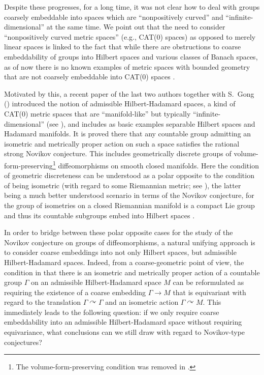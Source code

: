 \documentclass[11pt]{article}
\theoremstyle{definition}
\theoremstyle{plain}
\begin{document}
Despite these progresses, for a long time, it was not clear how to deal with groups coarsely embeddable into spaces which are ``nonpositively curved'' and ``infinite-dimensional'' at the same time.  
We point out that the need to consider ``nonpositively curved metric spaces'' (e.g., CAT(0) spaces) as opposed to merely linear spaces is linked to the fact that while there are obstructions to coarse embeddability of groups into Hilbert spaces and various classes of Banach spaces, as of now there is no known examples of metric spaces with bounded geometry that are not coarsely embeddable into CAT(0) spaces \cite[Question~9]{EskenazisNaor2019}. 


















Motivated by this, 
a recent paper of the last two authors together with S.~Gong (\cite{GWY2018}) introduced the notion of admissible Hilbert-Hadamard spaces, a kind of CAT(0) metric spaces that are ``manifold-like'' but typically ``infinite-dimensional'' (see ), and includes as basic examples separable Hilbert spaces and Hadamard manifolds. It is proved there that any countable group admitting an isometric and metrically proper action on such a space satisfies the rational strong Novikov conjecture. 
This includes geometrically discrete groups of volume-form-preserving\footnote{The volume-form-preserving condition was removed in \cite{GWXY2023}.} diffeomorphisms on smooth closed manifolds. Here the condition of geometric discreteness can be understood as a polar opposite to the condition of being isometric (with regard to some Riemannian metric; see \cite[the discussion below Theorem~1.3]{GWY2018}), the latter being a much better understood scenario in terms of the Novikov conjecture, for the group of isometries on a closed Riemannian manifold is a compact Lie group and thus its countable subgroups embed into Hilbert spaces \cite{GHW05}. 

In order to bridge between these polar opposite cases for the study of the Novikov conjecture on groups of diffeomorphisms, a natural unifying approach is to consider coarse embeddings into not only Hilbert spaces, but admissible Hilbert-Hadamard spaces. 
Indeed, from a coarse-geometric point of view, the condition in \cite{GWY2018} that there is an isometric and metrically proper action of a countable group $\Gamma$ on an admissible Hilbert-Hadamard space $M$ can be reformulated as requiring the existence of a coarse embedding $\Gamma \to M$ that is equivariant with regard to the translation $\Gamma \curvearrowright \Gamma$ and an isometric action $\Gamma \curvearrowright M$.  
This immediately leads to the following question: if we only require coarse embeddability into an admissible Hilbert-Hadamard space without requiring equivariance, what conclusions can we still draw with regard to Novikov-type conjectures? 
\end{document}
